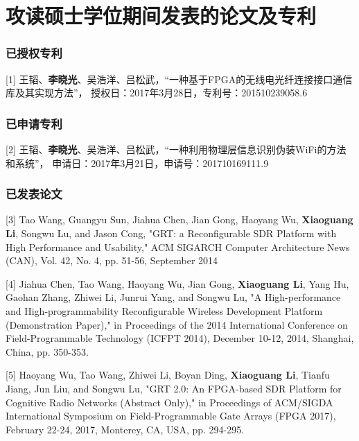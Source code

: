 
\chapter{攻读硕士学位期间发表的论文及专利}
\raggedbottom %
	\begin{description}
		\subsection*{已授权专利}
		\item{[1]} 王韬、\textbf{李晓光}、吴浩洋、吕松武，“一种基于FPGA的无线电光纤连接接口通信库及其实现方法”，
		授权日：2017年3月28日，专利号：201510239058.6
		\subsection*{已申请专利}
		\item{[2]} 王韬、\textbf{李晓光}、吴浩洋、吕松武，“一种利用物理层信息识别伪装WiFi的方法和系统”，
		申请日：2017年3月21日，申请号：201710169111.9
		\subsection*{已发表论文}
		\item{[3]} Tao Wang, Guangyu Sun, Jiahua Chen, Jian Gong, Haoyang Wu, \textbf{Xiaoguang Li}, Songwu Lu, and Jason Cong, "GRT: a Reconfigurable SDR Platform with High Performance and Usability," ACM SIGARCH Computer Architecture News (CAN), Vol. 42, No. 4, pp. 51-56, September 2014

		\item{[4]} Jiahua Chen, Tao Wang, Haoyang Wu, Jian Gong, \textbf{Xiaoguang Li}, Yang Hu, Gaohan Zhang, Zhiwei Li, Junrui Yang, and Songwu Lu, "A High-performance and High-programmability Reconfigurable Wireless Development Platform (Demonstration Paper)," in Proceedings of the 2014 International Conference on Field-Programmable Technology (ICFPT 2014), December 10-12, 2014, Shanghai, China, pp. 350-353.

		\item{[5]} Haoyang Wu, Tao Wang, Zhiwei Li, Boyan Ding, \textbf{Xiaoguang Li}, Tianfu Jiang, Jun Liu, and Songwu Lu, "GRT 2.0: An FPGA-based SDR Platform for Cognitive Radio Networks (Abstract Only)," in Proceedings of ACM/SIGDA International Symposium on Field-Programmable Gate Arrays (FPGA 2017), February 22-24, 2017, Monterey, CA, USA, pp. 294-295.


\end{description}
